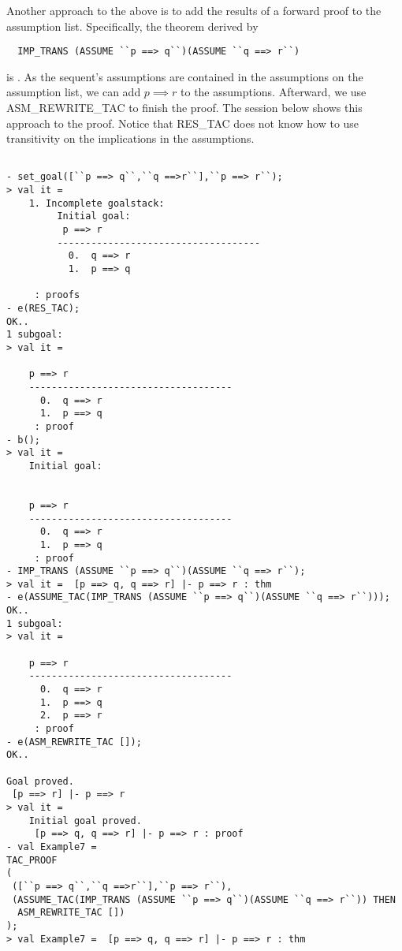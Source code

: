 Another approach to the above is to add the results of a forward proof
to the assumption list.  Specifically, the theorem derived by
\begin{verbatim}
  IMP_TRANS (ASSUME ``p ==> q``)(ASSUME ``q ==> r``)
\end{verbatim}
is . As the sequent's
assumptions are contained in the assumptions on the assumption list,
we can add $p \implies r$ to the assumptions. Afterward, we use
ASM\_REWRITE\_TAC to finish the proof. The session below shows this
approach to the proof.  Notice that RES\_TAC does not know how to use
transitivity on the implications in the assumptions.
\begin{session}
  \begin{scriptsize}
\begin{verbatim}

- set_goal([``p ==> q``,``q ==>r``],``p ==> r``);
> val it =
    1. Incomplete goalstack:
         Initial goal:
          p ==> r
         ------------------------------------
           0.  q ==> r
           1.  p ==> q
         
     : proofs
- e(RES_TAC);
OK..
1 subgoal:
> val it =
    
    p ==> r
    ------------------------------------
      0.  q ==> r
      1.  p ==> q
     : proof
- b();
> val it =
    Initial goal:
    
    
    p ==> r
    ------------------------------------
      0.  q ==> r
      1.  p ==> q
     : proof
- IMP_TRANS (ASSUME ``p ==> q``)(ASSUME ``q ==> r``);
> val it =  [p ==> q, q ==> r] |- p ==> r : thm
- e(ASSUME_TAC(IMP_TRANS (ASSUME ``p ==> q``)(ASSUME ``q ==> r``)));
OK..
1 subgoal:
> val it =
    
    p ==> r
    ------------------------------------
      0.  q ==> r
      1.  p ==> q
      2.  p ==> r
     : proof
- e(ASM_REWRITE_TAC []);
OK..

Goal proved.
 [p ==> r] |- p ==> r
> val it =
    Initial goal proved.
     [p ==> q, q ==> r] |- p ==> r : proof
- val Example7 =
TAC_PROOF
(
 ([``p ==> q``,``q ==>r``],``p ==> r``),
 (ASSUME_TAC(IMP_TRANS (ASSUME ``p ==> q``)(ASSUME ``q ==> r``)) THEN
  ASM_REWRITE_TAC [])
);
> val Example7 =  [p ==> q, q ==> r] |- p ==> r : thm
\end{verbatim}
  \end{scriptsize}
\end{session}

